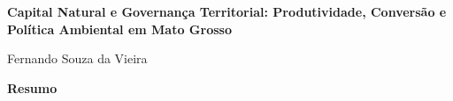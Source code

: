\documentclass[a4paper,12pt,twoside,brazil]{abntex2}
\begin{document}
\begin{center}
    {\Large \bfseries Capital Natural e Governança Territorial: Produtividade, Conversão e Política Ambiental em Mato Grosso }\par\vspace{0.8cm}
    Fernando Souza da Vieira
\end{center}

\vspace{0.8cm}

\noindent\textbf{Resumo}









\nocite{*}


\end{document}
